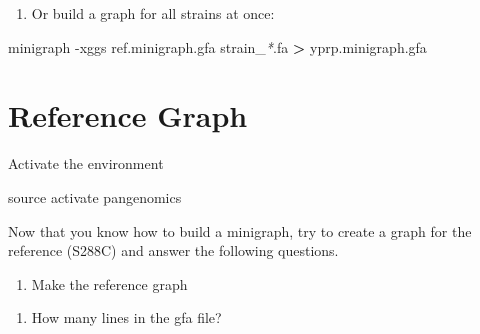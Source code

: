\documentclass[
]{book}
\newenvironment{Shaded}{\begin{snugshade}}{\end{snugshade}}
\newcommand{\AttributeTok}[1]{\textcolor[rgb]{0.77,0.63,0.00}{#1}}
\newcommand{\BuiltInTok}[1]{#1}
\newcommand{\ExtensionTok}[1]{#1}
\newcommand{\NormalTok}[1]{#1}
\newcommand{\OperatorTok}[1]{\textcolor[rgb]{0.81,0.36,0.00}{\textbf{#1}}}
\newcommand{\PreprocessorTok}[1]{\textcolor[rgb]{0.56,0.35,0.01}{\textit{#1}}}
\providecommand{\tightlist}{%
  \setlength{\itemsep}{0pt}\setlength{\parskip}{0pt}}
\begin{document}
\begin{enumerate}
\def\labelenumi{\arabic{enumi}.}
\setcounter{enumi}{2}
\tightlist
\item
  Or build a graph for all strains at once:
\end{enumerate}

\begin{Shaded}
\begin{Highlighting}[]
\ExtensionTok{minigraph} \AttributeTok{{-}xggs}\NormalTok{ ref.minigraph.gfa strain\_}\PreprocessorTok{*}\NormalTok{.fa }\OperatorTok{\textgreater{}}\NormalTok{ yprp.minigraph.gfa}
\end{Highlighting}
\end{Shaded}

\hypertarget{reference-graph}{%
\section{Reference Graph}\label{reference-graph}}

Activate the environment

\begin{Shaded}
\begin{Highlighting}[]
\BuiltInTok{source}\NormalTok{ activate pangenomics}
\end{Highlighting}
\end{Shaded}

Now that you know how to build a minigraph, try to create a graph for the reference (S288C) and answer the following questions.

\begin{enumerate}
\def\labelenumi{\arabic{enumi}.}
\tightlist
\item
  Make the reference graph
\end{enumerate}

\begin{Shaded}
\begin{Highlighting}[]

\end{Highlighting}
\end{Shaded}

\begin{enumerate}
\def\labelenumi{\arabic{enumi}.}
\setcounter{enumi}{1}
\tightlist
\item
  How many lines in the gfa file?
\end{enumerate}

\begin{Shaded}
\begin{Highlighting}[]

\end{Highlighting}
\end{Shaded}
\end{document}
